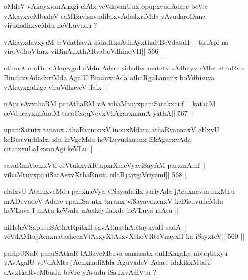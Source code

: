 \begin{artha}
oMdeV vAkayxvanAnxgi elAlx veVdavanUnx opupxvudAdare beVre 
vAkayxveMbudeV
saMBavisuvudilalxvAdadxriMda yAvudaroDane virudadhxveMdu heVLuvudu ?
\end{artha}

\begin{shl}
vAkayxdavxyaM ceVdathavA sidadhxsAdhAyxthaRBeVdataH ||
tadA\s pi na viroVdhoV\s tarx viBinAnxthARvaboVdhinoVH\hfill || 566 ||
\end{shl}

\begin{artha}
athavA eraDu vAkayxgaLeMdu Adare sidadhx matutx sAdhayx eMba athaRvu
BinanxvAdadxriMda AgalU BinanxvAda athaRgaLanunx boVdhisuva
vAkayxgaLige viroVdhaveV ilalx ||
\end{artha}

\begin{shl}
nApi sAvxthaRM parAthaRM vA vihaMtuyxpaniSatakxcitf ||
kathaM ceVducayxmAnaM tacaCxqqNevxVkAgarxmanA yathA\hfill || 567 ||
\end{shl}

\begin{artha}
upaniSatutx tananx athaRvanonxV inonxMdara athaRvanonxV elilxyU
keDisuvudilalx. idu heVgeMdu heVLuvudanunx EkAgarxvAda
citatxvuLaLxvanAgi keVLu ||
\end{artha}

\begin{shl}
savaRmAtemxVti ceVtukxyARtapxrXmeVyaviSayAM parxmAmf ||
vihaMtuyxpaniSatAsxvXthaRmiti nilaRjajxgiVriyamf\hfill || 568 ||
\end{shl}

\begin{artha}
elalxvU AtamxveMdu parxmeVya viSayadalilx sariyAda jAcnxnavanunxMTu
mADuvudeV Adare upaniSatutx tananx viSayavanenxV keDisuvudeMdu heVLuva
I mAtu keVvala nAcikeyilalxde heVLuva mAtu ||
\end{artha}

\begin{shl}
niHsheVSapuruSAthARpitxH savARnathARtayxyaH sadA ||
veVdAMtajAcnxnatashecxVtAsxyXtAsxvXthoVR\s toV\s nayxH ka iSayxteV\hfill || 569 ||
\end{shl}

\begin{artha}
paripUNaR puruSAthaR lABaveMbuva samasatx duHKagaLa nivaqtitxyu yAvAgalU
veVdAMta jAcnxnadiMda AguvudeV Adare idakikxMtalU sAvxthaRveMbudu
beVre yAvudu iSaTxvAdiVtu ?
\end{artha}

